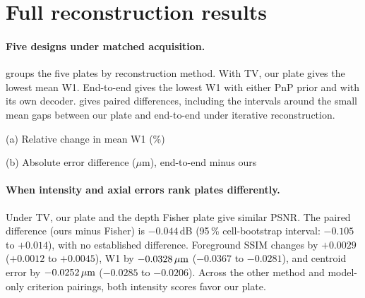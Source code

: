 \section{Full reconstruction results}
\label{sec:s:results}

\paragraph{Five designs under matched acquisition.}
 groups the five plates by reconstruction method. With TV, our plate gives the lowest mean W1. End-to-end gives the lowest W1 with either PnP prior and with its own decoder.  gives paired differences, including the intervals around the small mean gaps between our plate and end-to-end under iterative reconstruction.

\begin{table}[t]
\centering\small
\widetab{}
\caption{Five optical designs evaluated with the same 60 crops and five direction subsets per crop, at $C=8$ and matched nominal dose. Arrows give the preferred direction. FG-SSIM is foreground SSIM. We fine-tune each feed-forward decoder for its plate. The end-to-end decoder also receives joint training (\cref{sec:s:joint}).}
\label{tab:s:e2e}
\end{table}

\begin{table}[t]
\centering\small
(a) Relative change in mean W1 (\%)\par\smallskip
\widetab{}
\par\medskip (b) Absolute error difference ($\mu$m), end-to-end minus ours\par\smallskip

\caption{Paired comparisons on the 60 crops in \cref{tab:s:e2e}. In (a), each entry is $100(r-1)$, where $r$ is the column's ratio of mean W1 values. Negative values favor the numerator. In (b), negative values favor end-to-end. Brackets give paired 95\% cell-bootstrap intervals in the units of each panel.}
\label{tab:s:e2eintervals}
\end{table}

\paragraph{When intensity and axial errors rank plates differently.}
Under TV, our plate and the depth Fisher plate give similar PSNR. The paired difference (ours minus Fisher) is $-0.044$\,dB (95\,\% cell-bootstrap interval: $-0.105$ to $+0.014$), with no established difference. Foreground SSIM changes by $+0.0029$ ($+0.0012$ to $+0.0045$), W1 by $-0.0328\,\mu\mathrm{m}$ ($-0.0367$ to $-0.0281$), and centroid error by $-0.0252\,\mu\mathrm{m}$ ($-0.0285$ to $-0.0206$). Across the other method and model-only criterion pairings, both intensity scores favor our plate.

